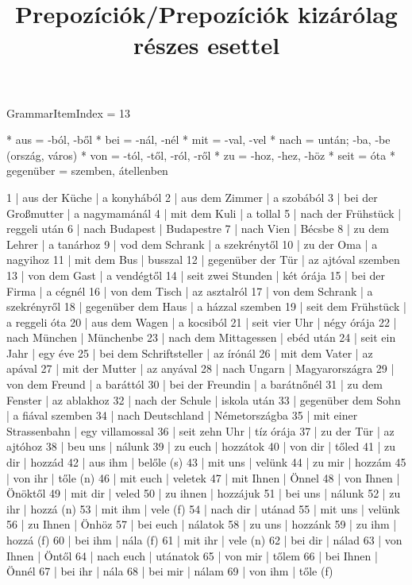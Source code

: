 \title{Prepozíciók/Prepozíciók kizárólag részes esettel}

GrammarItemIndex = 13

\begin{desc}
* aus = -ból, -ből
* bei = -nál, -nél
* mit = -val, -vel
* nach = untán; -ba, -be (ország, város)
* von = -tól, -től, -ról, -ről
* zu = -hoz, -hez, -höz
* seit = óta
* gegenüber = szemben, átellenben
\end{desc}

\begin{exmp}
1 | aus der Küche | a konyhából
2 | aus dem Zimmer | a szobából
3 | bei der Großmutter | a nagymamánál
4 | mit dem Kuli | a tollal
5 | nach der Frühstück | reggeli után
6 | nach Budapest | Budapestre
7 | nach Vien | Bécsbe
8 | zu dem Lehrer | a tanárhoz
9 | vod dem Schrank | a szekrénytől
10 | zu der Oma | a nagyihoz
11 | mit dem Bus | busszal
12 | gegenüber der Tür | az ajtóval szemben
13 | von dem Gast | a vendégtől
14 | seit zwei Stunden | két órája
15 | bei der Firma | a cégnél
16 | von dem Tisch | az asztalról
17 | von dem Schrank | a szekrényről
18 | gegenüber dem Haus | a házzal szemben
19 | seit dem Frühstück | a reggeli óta
20 | aus dem Wagen | a kocsiból
21 | seit vier Uhr | négy órája
22 | nach München | Münchenbe
23 | nach dem Mittagessen | ebéd után
24 | seit ein Jahr | egy éve
25 | bei dem Schriftsteller | az írónál
26 | mit dem Vater | az apával
27 | mit der Mutter | az anyával
28 | nach Ungarn | Magyarországra
29 | von dem Freund | a baráttól
30 | bei der Freundin | a barátnőnél
31 | zu dem Fenster | az ablakhoz
32 | nach der Schule | iskola után
33 | gegenüber dem Sohn | a fiával szemben
34 | nach Deutschland | Németországba
35 | mit einer Strassenbahn | egy villamossal
36 | seit zehn Uhr | tíz órája
37 | zu der Tür | az ajtóhoz
38 | beu uns | nálunk
39 | zu euch | hozzátok
40 | von dir | tőled
41 | zu dir | hozzád
42 | aus ihm | belőle (s)
43 | mit uns | velünk
44 | zu mir | hozzám
45 | von ihr | tőle (n)
46 | mit euch | veletek
47 | mit Ihnen | Önnel
48 | von Ihnen | Önöktől
49 | mit dir | veled
50 | zu ihnen | hozzájuk
51 | bei uns | nálunk
52 | zu ihr | hozzá (n)
53 | mit ihm | vele (f)
54 | nach dir | utánad
55 | mit uns | velünk
56 | zu Ihnen | Önhöz
57 | bei euch | nálatok
58 | zu uns | hozzánk
59 | zu ihm | hozzá (f)
60 | bei ihm | nála (f)
61 | mit ihr | vele (n)
62 | bei dir | nálad
63 | von Ihnen | Öntől
64 | nach euch | utánatok
65 | von mir | tőlem
66 | bei Ihnen | Önnél
67 | bei ihr | nála
68 | bei mir | nálam
69 | von ihm | tőle (f)
\end{exmp}

